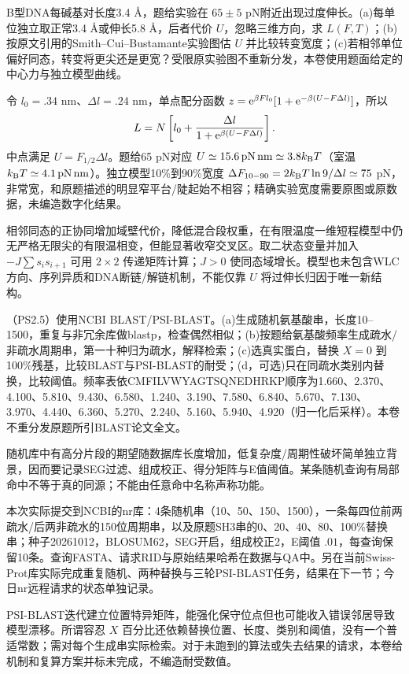 \begin{exercise}
B型DNA每碱基对长度3.4 \AA{}，题给实验在 $65\pm5$ pN附近出现过度伸长。(a)每单位独立取正常3.4 \AA{}或伸长5.8 \AA{}，后者代价 $U$，忽略三维方向，求 $L(F,T)$；(b)按原文引用的Smith--Cui--Bustamante实验图估 $U$ 并比较转变宽度；(c)若相邻单位偏好同态，转变将更尖还是更宽？受限原实验图不重新分发，本卷使用题面给定的中心力与独立模型曲线。
\end{exercise}
\begin{solution}
令 $l_0=.34$ nm、$\Delta l=.24$ nm，单点配分函数 $z=\mathrm e^{\beta Fl_0}[1+\mathrm e^{-\beta(U-F\Delta l)}]$，所以
\[
L=N\left[l_0+\frac{\Delta l}{1+\mathrm e^{\beta(U-F\Delta l)}}\right].
\]
中点满足 $U=F_{1/2}\Delta l$。题给65 pN对应 $U\simeq15.6\,\mathrm{pN\,nm}\simeq3.8k_{\mathrm B} T$（室温 $k_{\mathrm B} T\simeq4.1\,\mathrm{pN\,nm}$）。独立模型10\%到90\%宽度 $\Delta F_{10-90}=2k_{\mathrm B} T\ln9/\Delta l\simeq75$ pN，非常宽，和原题描述的明显窄平台/陡起始不相容；精确实验宽度需要原图或原数据，未编造数字化结果。

相邻同态的正协同增加域壁代价，降低混合段权重，在有限温度一维短程模型中仍无严格无限尖的有限温相变，但能显著收窄交叉区。取二状态变量并加入 $-J\sum s_is_{i+1}$ 可用 $2\times2$ 传递矩阵计算；$J>0$ 使同态域增长。模型也未包含WLC方向、序列异质和DNA断链/解链机制，不能仅靠 $U$ 将过伸长归因于唯一新结构。
\end{solution}

\begin{exercise}
（PS2.5）使用NCBI BLAST/PSI-BLAST。(a)生成随机氨基酸串，长度10--1500，重复与非冗余库做blastp，检查偶然相似；(b)按题给氨基酸频率生成疏水/非疏水周期串，第一十种归为疏水，解释检索；(c)选真实蛋白，替换 $X=0$ 到100\%残基，比较BLAST与PSI-BLAST的耐受；(d，可选)只在同疏水类别内替换，比较阈值。频率表依CMFILVWYAGTSQNEDHRKP顺序为1.660、2.370、4.100、5.810、9.430、6.580、1.240、3.190、7.580、6.840、5.670、7.130、3.970、4.440、6.360、5.270、2.240、5.160、5.940、4.920（归一化后采样）。本卷不重分发原题所引BLAST论文全文。
\end{exercise}
\begin{solution}
随机库中有高分片段的期望随数据库长度增加，低复杂度/周期性破坏简单独立背景，因而要记录SEG过滤、组成校正、得分矩阵与E值阈值。某条随机查询有局部命中不等于真的同源；不能由任意命中名称声称功能。

本次实际提交到NCBI的nr库：4条随机串（10、50、150、1500），一条每四位前两疏水/后两非疏水的150位周期串，以及原题SH3串的0、20、40、80、100\%替换串；种子20261012，BLOSUM62，SEG开启，组成校正2，E阈值 $.01$，每查询保留10条。查询FASTA、请求RID与原始结果哈希在数据与QA中。另在当前Swiss-Prot库实际完成重复随机、两种替换与三轮PSI-BLAST任务，结果在下一节；今日nr远程请求的状态单独记录。

PSI-BLAST迭代建立位置特异矩阵，能强化保守位点但也可能收入错误邻居导致模型漂移。所谓容忍 $X$ 百分比还依赖替换位置、长度、类别和阈值，没有一个普适常数；需对每个生成串实际检索。对于未跑到的算法或失去结果的请求，本卷给机制和复算方案并标未完成，不编造耐受数值。
\end{solution}


